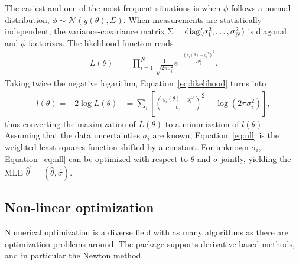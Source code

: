\documentclass[article]{jss}
\begin{document}
The easiest and one of the most frequent situations is when $\phi$ follows a normal distribution, $\phi\sim\mathcal N(y(\theta), \Sigma)$. When measurements are statistically independent, the variance-covariance matrix $\Sigma = {\rm diag}(\sigma_1^2, \dots, \sigma_N^2)$ is diagonal and $\phi$ factorizes. The likelihood function reads 
\begin{align}
	L(\theta) &= \prod_{i = 1}^N \frac{1}{\sqrt{2\pi\sigma_i^2}} e^{-\frac{(y_i(\theta)-y_i^D)^2}{2\sigma_i^2}} .
\label{eq:likelihood}
\end{align}
Taking twice the negative logarithm, Equation~\ref{eq:likelihood} turns into
\begin{align}
	l(\theta) = -2\log L(\theta) &= \sum_i \left[\left(\frac{y_i(\theta) - y_i^D}{\sigma_i}\right)^2 + \log(2\pi\sigma_i^2)\right],
\label{eq:nll}
\end{align}
thus converting the maximization of $L(\theta)$ to a minimization of $l(\theta)$.
Assuming that the data uncertainties $\sigma_i$ are known, Equation~\ref{eq:nll} is the weighted least-squares function shifted by a constant. For unknown $\sigma_i$, Equation~\ref{eq:nll} can be optimized with respect to $\theta$ and $\sigma$ jointly, yielding the MLE $\hat\theta^{\prime} = (\hat\theta, \hat\sigma)$. 

\subsection{Non-linear optimization}

Numerical optimization is a diverse field with as many algorithms as there are optimization problems around. The  package supports derivative-based methods, and in particular the Newton method.
\end{document}
